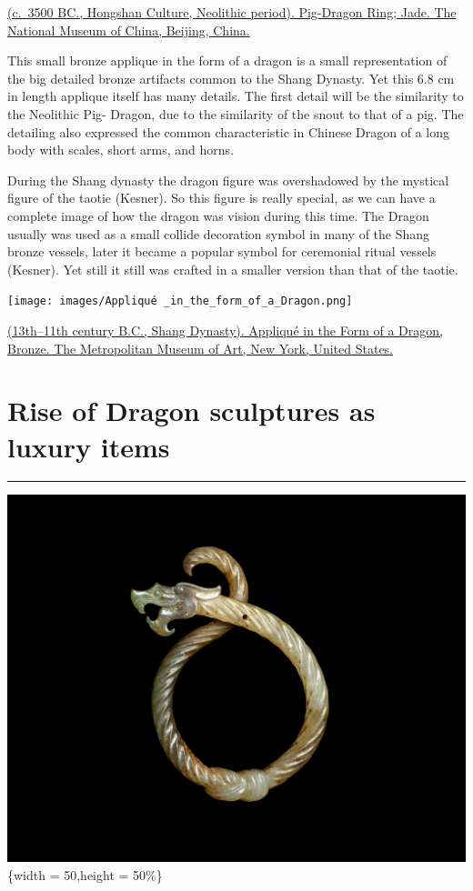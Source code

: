 \documentclass[
]{book}
\begin{document}
\href{}{(c.~3500 BC., Hongshan Culture, Neolithic period). Pig-Dragon Ring; Jade. The National Museum of China, Beijing, China.}

This small bronze applique in the form of a dragon is a small representation of the big detailed bronze artifacts common to the Shang Dynasty. Yet this 6.8 cm in length applique itself has many details. The first detail will be the similarity to the Neolithic Pig- Dragon, due to the similarity of the snout to that of a pig. The detailing also expressed the common characteristic in Chinese Dragon of a long body with scales, short arms, and horns.

During the Shang dynasty the dragon figure was overshadowed by the mystical figure of the taotie (Kesner). So this figure is really special, as we can have a complete image of how the dragon was vision during this time. The Dragon usually was used as a small collide decoration symbol in many of the Shang bronze vessels, later it became a popular symbol for ceremonial ritual vessels (Kesner). Yet still it still was crafted in a smaller version than that of the taotie.

\texttt{[image: images/Appliqué \_in\_the\_form\_of\_a\_Dragon.png]}

\href{https://www.metmuseum.org/art/collection/search/49505}{(13th--11th century B.C., Shang Dynasty). Appliqué in the Form of a Dragon, Bronze. The Metropolitan Museum of Art, New York, United States.}

\hypertarget{zhou_han}{%
\chapter*{Rise of Dragon sculptures as luxury items}\label{zhou_han}}

\begin{center}\rule{0.5\linewidth}{0.5pt}\end{center}

\includegraphics{images/knotted_dragon.jpg}\{width = 50,height = 50\%\}
\end{document}
